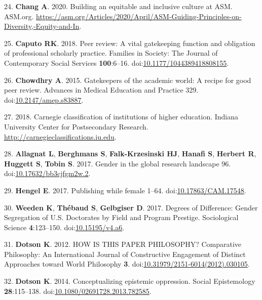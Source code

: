 \documentclass[11pt,]{article}
\begin{document}
\leavevmode\hypertarget{ref-chang_2020}{}%
24. \textbf{Chang A}. 2020. Building an equitable and inclusive culture
at ASM. ASM.org.
\url{https://asm.org/Articles/2020/April/ASM-Guiding-Principles-on-Diversity,-Equity-and-In}.

\leavevmode\hypertarget{ref-Caputo2018}{}%
25. \textbf{Caputo RK}. 2018. Peer review: A vital gatekeeping function
and obligation of professional scholarly practice. Families in Society:
The Journal of Contemporary Social Services \textbf{100}:6--16.
doi:\href{https://doi.org/10.1177/1044389418808155}{10.1177/1044389418808155}.

\leavevmode\hypertarget{ref-Chowdhry2015}{}%
26. \textbf{Chowdhry A}. 2015. Gatekeepers of the academic world: A
recipe for good peer review. Advances in Medical Education and Practice
329.
doi:\href{https://doi.org/10.2147/amep.s83887}{10.2147/amep.s83887}.

\leavevmode\hypertarget{ref-Carnegie2018}{}%
27. 2018. Carnegie classification of institutions of higher education.
Indiana University Center for Postsecondary Research.
\url{http://carnegieclassifications.iu.edu}.

\leavevmode\hypertarget{ref-allagnat_gender_2017}{}%
28. \textbf{Allagnat L}, \textbf{Berghmans S}, \textbf{Falk-Krzesinski
HJ}, \textbf{Hanafi S}, \textbf{Herbert R}, \textbf{Huggett S},
\textbf{Tobin S}. 2017. Gender in the global research landscape 96.
doi:\href{https://doi.org/10.17632/bb3cjfgm2w.2}{10.17632/bb3cjfgm2w.2}.

\leavevmode\hypertarget{ref-erin_hengel_publishing_2017}{}%
29. \textbf{Hengel E}. 2017. Publishing while female 1--64.
doi:\href{https://doi.org/10.17863/CAM.17548}{10.17863/CAM.17548}.

\leavevmode\hypertarget{ref-weeden_degrees_2017}{}%
30. \textbf{Weeden K}, \textbf{Thébaud S}, \textbf{Gelbgiser D}. 2017.
Degrees of Difference: Gender Segregation of U.S. Doctorates by Field
and Program Prestige. Sociological Science \textbf{4}:123--150.
doi:\href{https://doi.org/10.15195/v4.a6}{10.15195/v4.a6}.

\leavevmode\hypertarget{ref-Dotson2012}{}%
31. \textbf{Dotson K}. 2012. HOW IS THIS PAPER PHILOSOPHY? Comparative
Philosophy: An International Journal of Constructive Engagement of
Distinct Approaches toward World Philosophy \textbf{3}.
doi:\href{https://doi.org/10.31979/2151-6014(2012).030105}{10.31979/2151-6014(2012).030105}.

\leavevmode\hypertarget{ref-Dotson2014}{}%
32. \textbf{Dotson K}. 2014. Conceptualizing epistemic oppression.
Social Epistemology \textbf{28}:115--138.
doi:\href{https://doi.org/10.1080/02691728.2013.782585}{10.1080/02691728.2013.782585}.
\end{document}
